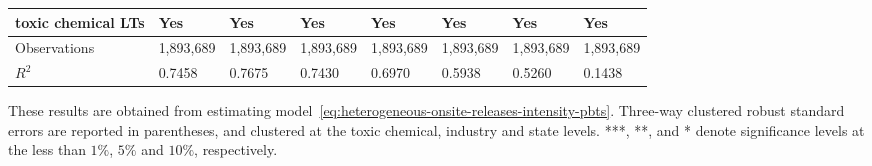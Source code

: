 \begin{table}[H]
{\begin{tabular}{@{}llllllll@{}}
            toxic chemical LTs              & Yes       & Yes           & Yes       & Yes          & Yes             & Yes           & Yes                 \\\midrule\midrule
            Observations                    & 1,893,689 & 1,893,689     & 1,893,689 & 1,893,689    & 1,893,689       & 1,893,689     & 1,893,689           \\
            $R^2$                           & 0.7458    & 0.7675        & 0.7430    & 0.6970       & 0.5938          & 0.5260        & 0.1438              \\ \bottomrule\bottomrule
        \end{tabular}%
    }
    \begin{minipage}{18cm}
        \vspace{0.05in}
        These results are obtained from estimating model~\ref{eq:heterogeneous-onsite-releases-intensity-pbts}. Three-way clustered robust standard errors are reported in parentheses, and clustered at the toxic chemical, industry and state levels. ***, **, and * denote significance levels at the less than $1\%$, $5\%$ and $10\%$, respectively.
    \end{minipage}
\end{table}